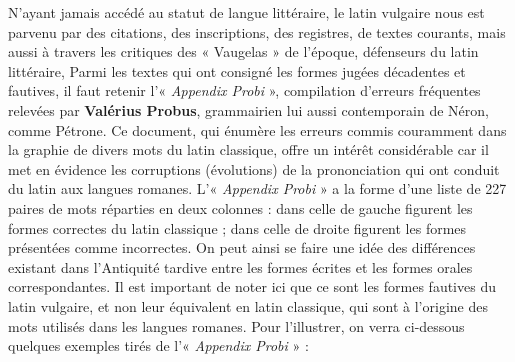 N’ayant jamais accédé au statut de langue littéraire, le latin vulgaire nous est parvenu par des citations, des inscriptions, des registres, de textes courants, mais aussi à travers les critiques des « Vaugelas » de l’époque, défenseurs du latin littéraire, Parmi les textes qui ont consigné les formes jugées décadentes et fautives, il faut retenir l’« \textit{Appendix Probi} », compilation d’erreurs fréquentes relevées par \textbf{Valérius Probus}, grammairien lui aussi contemporain de Néron, comme Pétrone. Ce document, qui énumère les erreurs commis couramment dans la graphie de divers mots du latin classique, offre un intérêt considérable car il met en évidence les corruptions (évolutions) de la prononciation qui ont conduit du latin aux langues romanes. L’« \textit{Appendix Probi} » a la forme d’une liste de 227 paires de mots réparties en deux colonnes : dans celle de gauche figurent les formes correctes du latin classique ; dans celle de droite figurent les formes présentées comme incorrectes. On peut ainsi se faire une idée des différences existant dans l’Antiquité tardive entre les formes écrites et les formes orales correspondantes. Il est important de noter ici que ce sont les formes fautives du latin vulgaire, et non leur équivalent en latin classique, qui sont à l’origine des mots utilisés dans les langues romanes. Pour l’illustrer, on verra ci-dessous quelques exemples tirés de l’« \textit{Appendix Probi} » :

